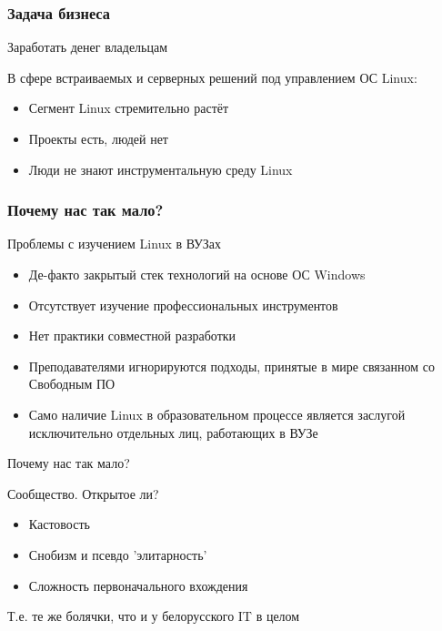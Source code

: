 \begin{frame}
	\frametitle{Задача бизнеса}

	\begin{block}{Заработать денег владельцам}

	В сфере встраиваемых и серверных решений под управлением ОС Linux:
	\begin{itemize}
	  \item Сегмент Linux стремительно растёт
	  \item Проекты есть, людей нет
	  \item Люди не знают инструментальную среду Linux
	\end{itemize} 

      \end{block}
\end{frame}



\begin{frame}
	\frametitle{Почему нас так мало?}

	\begin{block}{Проблемы с изучением Linux в ВУЗах}
		\begin{itemize}
			\item Де-факто закрытый стек технологий на основе ОС Windows
			\item Отсутствует изучение профессиональных инструментов
			\item Нет практики совместной разработки
			\item Преподавателями игнорируются подходы, принятые в мире связанном со Свободным ПО
			\item Само наличие Linux в образовательном процессе является 
				заслугой исключительно отдельных лиц, работающих в ВУЗе
		\end{itemize}
	\end{block}
\end{frame}
  

\begin{frame}{Почему нас так мало?}
  \begin{block}{Сообщество. Открытое ли?}
    \begin{itemize}
      \item Кастовость
      \item Снобизм и псевдо 'элитарность'
      \item Сложность первоначального вхождения
    \end{itemize} 
  \end{block} \pause

  \alert{Т.е. те же болячки, что и у белорусского IT в целом}
\end{frame}


